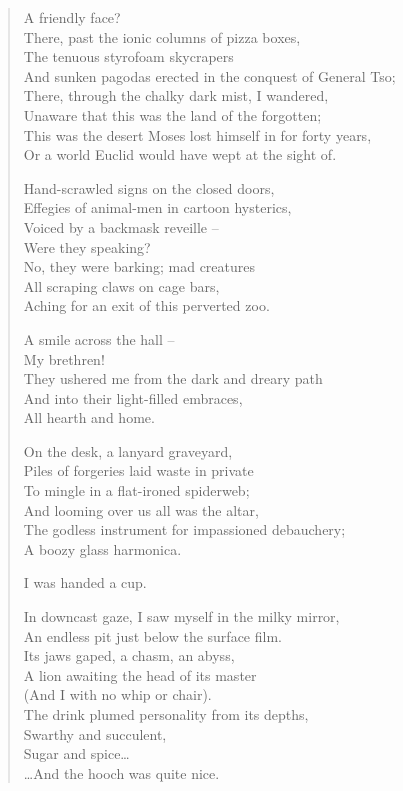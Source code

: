 \begin{verse}
  A friendly face?\\
  There, past the ionic columns of pizza boxes,\\
  The tenuous styrofoam skycrapers\\
  And sunken pagodas erected in the conquest of General Tso;\\
  There, through the chalky dark mist, I wandered,\\
  Unaware that this was the land of the forgotten;\\
  This was the desert Moses lost himself in for forty years,\\
  Or a world Euclid would have wept at the sight of.\par

  Hand-scrawled signs on the closed doors,\\
  Effegies of animal-men in cartoon hysterics,\\
  Voiced by a backmask reveille --\\
  Were they speaking?\\
  No, they were barking; mad creatures\\
  All scraping claws on cage bars,\\
  Aching for an exit of this perverted zoo.\par

  A smile across the hall --\\
  My brethren!\\
  They ushered me from the dark and dreary path\\
  And into their light-filled embraces,\\
  All hearth and home.\par

  On the desk, a lanyard graveyard,\\
  Piles of forgeries laid waste in private\\
  To mingle in a flat-ironed spiderweb;\\
  And looming over us all was the altar,\\
  The godless instrument for impassioned debauchery;\\
  A boozy glass harmonica.\par

  I was handed a cup.\par

  In downcast gaze, I saw myself in the milky mirror,\\
  An endless pit just below the surface film.\\
  Its jaws gaped, a chasm, an abyss,\\
  A lion awaiting the head of its master\\
  (And I with no whip or chair).\\
  The drink plumed personality from its depths,\\
  Swarthy and succulent,\\
  Sugar and spice\ldots \\
  \ldots And the hooch was quite nice.\par


\end{verse}
